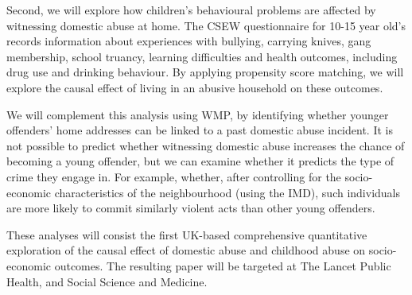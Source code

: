 \documentclass[11pt, a4paper]{article}
\begin{document}
%
%



Second, we will explore how children's behavioural problems are affected by witnessing domestic abuse at home. The CSEW questionnaire for 10-15 year old's records information about experiences with bullying, carrying knives, gang membership, school truancy, learning difficulties and health outcomes, including drug use and drinking behaviour. By applying propensity score matching, we will explore the causal effect of living in an abusive household on these outcomes.

We will complement this analysis using WMP, by identifying whether younger offenders' home addresses can be linked to a past domestic abuse incident. It is not possible to predict whether witnessing domestic abuse increases the chance of becoming a young offender, but we can examine whether it predicts the type of crime they engage in. For example, whether, after controlling for the socio-economic characteristics of the neighbourhood (using the IMD), such individuals are more likely to commit similarly violent acts than other young offenders.


 These analyses will consist the first UK-based comprehensive quantitative exploration of the causal effect of domestic abuse and childhood abuse on socio-economic outcomes. The resulting paper will be targeted at The Lancet Public Health, and Social Science and Medicine.
 
\end{document}

